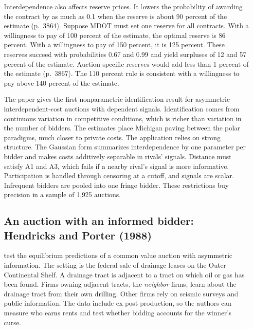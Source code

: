 Interdependence also affects reserve prices. It lowers the probability of awarding the contract by as much as
0.1 when the reserve is about 90 percent of the estimate (p.~3864). Suppose MDOT must set one reserve for all
contracts. With a willingness to pay of 100 percent of the estimate, the optimal reserve is 86 percent. With a
willingness to pay of 150 percent, it is 125 percent. These reserves succeed with probabilities 0.67 and 0.99 and yield surpluses
of 12 and 57 percent of the estimate. Auction-specific reserves would add less than 1 percent of the estimate
(p.~3867). The 110 percent rule is consistent with a willingness to pay above 140 percent of the estimate.

 The paper gives the first nonparametric identification result for asymmetric
interdependent-cost auctions with dependent signals. Identification comes from continuous variation in
competitive conditions, which is richer than variation in the number of bidders. The estimates place Michigan paving between the polar
paradigms, much closer to private costs. The application relies on strong structure. The Gaussian form summarizes
interdependence by one parameter per bidder and makes costs additively separable in rivals' signals. Distance must
satisfy A1 and A3, which fails if a nearby rival's signal is more informative. Participation is handled through
censoring at a cutoff, and signals are scalar. Infrequent bidders are pooled into one fringe bidder. These restrictions
buy precision in a sample of 1,925 auctions.

\subsection{An auction with an informed bidder: Hendricks and Porter (1988)}\label{sec:15-cv-hp}

 \citet{HendricksPorter1988} test the equilibrium predictions of a common value auction with
asymmetric information. The setting is the federal sale of drainage leases on the Outer Continental Shelf. A
drainage tract is adjacent to a tract on which oil or gas has been found. Firms owning adjacent tracts, the
\emph{neighbor} firms, learn about the drainage tract from their own drilling. Other firms rely on seismic
surveys and public information. The data include ex post production, so the authors can measure who earns
rents and test whether bidding accounts for the winner's curse.

